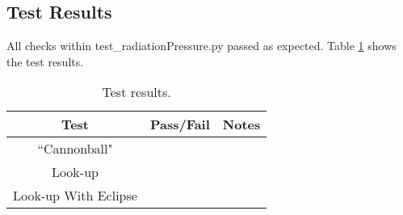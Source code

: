 \subsection{Test Results}

All checks within test\_radiationPressure.py passed as expected. Table \ref{tab:results} shows the test results.

\begin{table}[H]
	\caption{Test results.}
	\label{tab:results}
	\centering \fontsize{10}{10}\selectfont
	\begin{tabular}{c | c | c  } %
		\hline
		\textbf{Test} 				      & \textbf{Pass/Fail} 						   		   		 & \textbf{Notes} 									        \\ \hline
		``Cannonball"	   			  	&      	  & 	        \\ \hline
		Look-up	   	                     &              		&            		\\ \hline
		Look-up With Eclipse      &  &\\ \hline
	\end{tabular}
\end{table}
